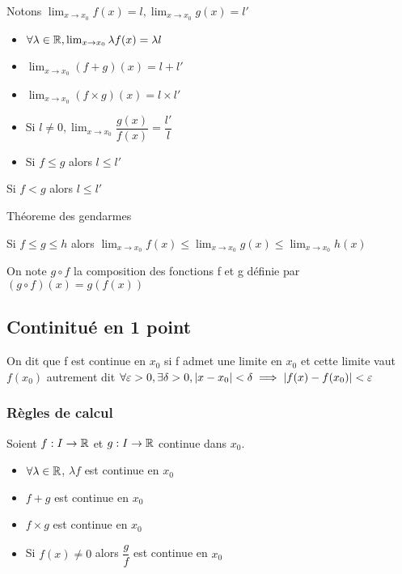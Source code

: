 \documentclass[a4paper, 12pt]{article}
\begin{document}
Notons $\lim_{x \to x_0}f(x) = l, \lim_{x \to x_0}g(x) = l'$

\begin{itemize}
    \item $\forall \lambda \in \mathbb{R}, \lim_{x \to x_0}\lambda f(x) = \lambda l$
    \item $\lim_{x \to x_0}(f + g)(x) = l + l'$
    \item $\lim_{x \to x_0}(f \times g)(x) = l \times l'$
    \item Si $l \neq 0, \lim_{x \to x_0}\dfrac{g(x)}{f(x)} = \dfrac{l'}{l}$
    \item Si $f \leq g$ alors $l \leq l'$
\end{itemize}

\begin{remark}
    Si $f \lt g$ alors $l \leq l'$
\end{remark}

\begin{theorem}
    Théoreme des gendarmes

    Si $f \leq g \leq h$ alors $\lim_{x \to x_0}f(x) \leq \lim_{x \to x_0}g(x) \leq \lim_{x \to x_0}h(x)$
\end{theorem}

\begin{proprietes}
    On note $g \circ f$ la composition des fonctions f et g définie par $(g \circ f)(x) = g(f(x))$
\end{proprietes}

\subsection{Continitué en 1 point}

\begin{definition}
    On dit que f est continue en $x_0$ si f admet une limite en $x_0$ et cette limite vaut $f(x_0)$ autrement dit $\forall \varepsilon > 0, \exists \delta > 0, |x - x_0| < \delta \implies |f(x) - f(x_0)| < \varepsilon$
\end{definition}

\subsubsection{Règles de calcul}

Soient $f: I \to \mathbb{R}$ et $g: I \to \mathbb{R}$ continue dans $x_0$.

\begin{itemize}
    \item $\forall \lambda \in \mathbb{R}$, $\lambda f$ est continue en $x_0$
    \item $f + g$ est continue en $x_0$
    \item $f \times g$ est continue en $x_0$
    \item Si $f(x) \neq 0$ alors $\dfrac{g}{f}$ est continue en $x_0$
\end{itemize}
\end{document}
